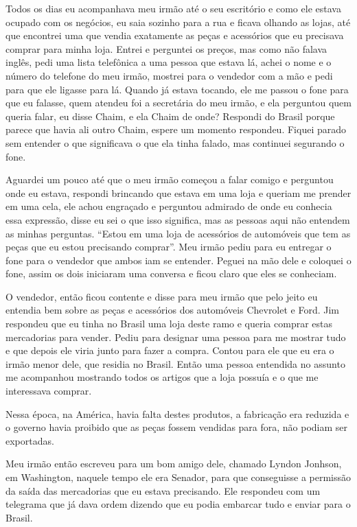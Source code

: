 Todos os dias eu acompanhava meu irmão até o seu escritório e como ele
estava ocupado com os negócios, eu saia sozinho para a rua e ficava
olhando as lojas, até que encontrei uma que vendia exatamente as peças e
acessórios que eu precisava comprar para minha loja. Entrei e perguntei
os preços, mas como não falava inglês, pedi uma lista telefônica a uma
pessoa que estava lá, achei o nome e o número do telefone do meu irmão,
mostrei para o vendedor com a mão e pedi para que ele ligasse para lá.
Quando já estava tocando, ele me passou o fone para que eu falasse, quem
atendeu foi a secretária do meu irmão, e ela perguntou quem queria
falar, eu disse Chaim, e ela Chaim de onde? Respondi do Brasil porque
parece que havia ali outro Chaim, espere um momento respondeu. Fiquei
parado sem entender o que significava o que ela tinha falado, mas
continuei segurando o fone.

Aguardei um pouco até que o meu irmão começou a falar comigo e perguntou
onde eu estava, respondi brincando que estava em uma loja e queriam me
prender em uma cela, ele achou engraçado e perguntou admirado de onde eu
conhecia essa expressão, disse eu sei o que isso significa, mas as
pessoas aqui não entendem as minhas perguntas. ``Estou em uma loja de
acessórios de automóveis que tem as peças que eu estou precisando
comprar''. Meu irmão pediu para eu entregar o fone para o vendedor que
ambos iam se entender. Peguei na mão dele e coloquei o fone, assim os
dois iniciaram uma conversa e ficou claro que eles se conheciam.

O vendedor, então ficou contente e disse para meu irmão que pelo jeito
eu entendia bem sobre as peças e acessórios dos automóveis Chevrolet e
Ford. Jim respondeu que eu tinha no Brasil uma loja deste ramo e queria
comprar estas mercadorias para vender. Pediu para designar uma pessoa
para me mostrar tudo e que depois ele viria junto para fazer a compra.
Contou para ele que eu era o irmão menor dele, que residia no Brasil.
Então uma pessoa entendida no assunto me acompanhou mostrando todos os
artigos que a loja possuía e o que me interessava comprar.

Nessa época, na América, havia falta destes produtos, a fabricação era
reduzida e o governo havia proibido que as peças fossem vendidas para
fora, não podiam ser exportadas.

Meu irmão então escreveu para um bom amigo dele, chamado Lyndon Jonhson,
em Washington, naquele tempo ele era Senador, para que conseguisse a
permissão da saída das mercadorias que eu estava precisando. Ele
respondeu com um telegrama que já dava ordem dizendo que eu podia
embarcar tudo e enviar para o Brasil.

